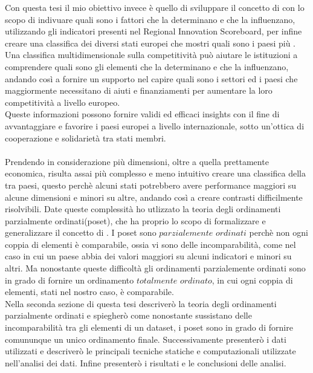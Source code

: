 \documentclass[12pt]{article}
\begin{document}
Con questa tesi il mio obiettivo invece è quello di sviluppare il concetto di  con lo scopo di indivuare quali sono i 
fattori che la determinano e che la influenzano, utilizzando gli indicatori presenti nel Regional Innovation Scoreboard, per infine 
creare una classifica dei diversi stati europei che mostri quali sono i paesi più . \\
Una classifica multidimensionale sulla competitività può aiutare le istituzioni a comprendere quali sono gli elementi che la determinano e 
che la influenzano, andando così a fornire un supporto nel capire quali sono i settori ed i paesi che maggiormente necessitano di 
aiuti e finanziamenti per aumentare la loro competitività a livello europeo. \\
Queste informazioni possono fornire validi ed efficaci insights con il fine di avvantaggiare e favorire i paesi europei a livello 
internazionale, sotto un'ottica di cooperazione e solidarietà tra stati membri. \\
\\
Prendendo in considerazione più dimensioni, oltre a quella prettamente economica, risulta assai più complesso e meno intuitivo creare
una classifica della  tra paesi, questo perchè alcuni stati potrebbero avere performance maggiori su alcune dimensioni e minori 
su altre, andando così a creare contrasti difficilmente risolvibili. Date queste complessità ho utlizzato la teoria degli ordinamenti parzialmente ordinati(poset), che ha proprio lo scopo di formalizzare e 
generalizzare il concetto di . I poset sono $\textit{parzialemente ordinati}$ perchè non ogni coppia di elementi è 
comparabile, ossia vi sono delle incomparabilità, come nel caso in cui un paese abbia dei valori maggiori su alcuni indicatori e minori 
su altri. Ma nonostante queste difficoltà gli ordinamenti parzialemente ordinati sono in grado di fornire un ordinamento
$\textit{totalmente ordinato}$, in cui ogni coppia di elementi, stati nel nostro caso, è comparabile. \\
Nella seconda sezione di questa tesi descriverò la teoria degli ordinamenti parzialmente ordinati e spiegherò come nonostante 
sussistano delle incomparabilità tra gli elementi di un dataset, i poset sono in grado di fornire comununque un unico ordinamento finale. Successivamente 
presenterò i dati utilizzati e descriverò le principali tecniche statiche e computazionali utilizzate nell'analisi dei dati. Infine 
presenterò i risultati e le conclusioni delle analisi. 
\end{document}
